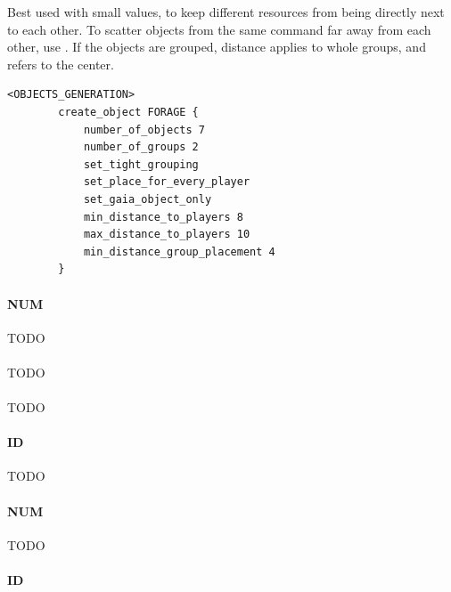     Best used with small values, to keep different resources from being directly next to each other. To scatter objects from the same command far away from each other, use . If the objects are grouped, distance applies to whole groups, and refers to the center.

    \begin{lstlisting}[language={rms}, caption={Give each player two sets of forages and make them avoid each other by 4 tiles, and keep all future objects 4 tiles away.}]
        <OBJECTS_GENERATION>
        create_object FORAGE {
            number_of_objects 7
            number_of_groups 2
            set_tight_grouping
            set_place_for_every_player
            set_gaia_object_only
            min_distance_to_players 8
            max_distance_to_players 10
            min_distance_group_placement 4
        }
    \end{lstlisting}

    \paragraph{ NUM}

    TODO

    \paragraph{}

    TODO

    \paragraph{}

    TODO

    \paragraph{ ID}

    TODO

    \paragraph{ NUM}

    TODO

    \paragraph{ ID}

